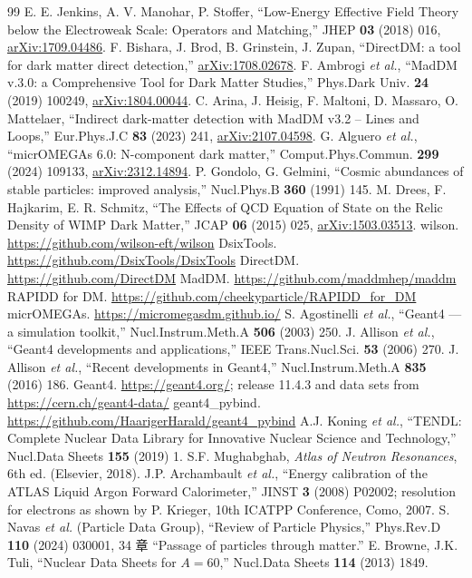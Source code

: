 \documentclass[a4paper,10pt]{ltjsarticle}
\begin{document}
\begin{thebibliography}{99}
 E. E. Jenkins, A. V. Manohar, P. Stoffer, ``Low-Energy Effective Field Theory below the Electroweak Scale: Operators and Matching,'' JHEP \textbf{03} (2018) 016, \href{https://arxiv.org/abs/1709.04486}{arXiv:1709.04486}.
 F. Bishara, J. Brod, B. Grinstein, J. Zupan, ``DirectDM: a tool for dark matter direct detection,'' \href{https://arxiv.org/abs/1708.02678}{arXiv:1708.02678}.
 F. Ambrogi \textit{et al.}, ``MadDM v.3.0: a Comprehensive Tool for Dark Matter Studies,'' Phys.Dark Univ. \textbf{24} (2019) 100249, \href{https://arxiv.org/abs/1804.00044}{arXiv:1804.00044}.
 C. Arina, J. Heisig, F. Maltoni, D. Massaro, O. Mattelaer, ``Indirect dark-matter detection with MadDM v3.2 -- Lines and Loops,'' Eur.Phys.J.C \textbf{83} (2023) 241, \href{https://arxiv.org/abs/2107.04598}{arXiv:2107.04598}.
 G. Alguero \textit{et al.}, ``micrOMEGAs 6.0: N-component dark matter,'' Comput.Phys.Commun. \textbf{299} (2024) 109133, \href{https://arxiv.org/abs/2312.14894}{arXiv:2312.14894}.
 P. Gondolo, G. Gelmini, ``Cosmic abundances of stable particles: improved analysis,'' Nucl.Phys.B \textbf{360} (1991) 145.
 M. Drees, F. Hajkarim, E. R. Schmitz, ``The Effects of QCD Equation of State on the Relic Density of WIMP Dark Matter,'' JCAP \textbf{06} (2015) 025, \href{https://arxiv.org/abs/1503.03513}{arXiv:1503.03513}.
 wilson. \url{https://github.com/wilson-eft/wilson}
 DsixTools. \url{https://github.com/DsixTools/DsixTools}
 DirectDM. \url{https://github.com/DirectDM}
 MadDM. \url{https://github.com/maddmhep/maddm}
 RAPIDD for DM. \url{https://github.com/cheekyparticle/RAPIDD_for_DM}
 micrOMEGAs. \url{https://micromegasdm.github.io/}
 S. Agostinelli \textit{et al.}, ``Geant4 --- a simulation toolkit,'' Nucl.Instrum.Meth.A \textbf{506} (2003) 250.
 J. Allison \textit{et al.}, ``Geant4 developments and applications,'' IEEE Trans.Nucl.Sci. \textbf{53} (2006) 270.
 J. Allison \textit{et al.}, ``Recent developments in Geant4,'' Nucl.Instrum.Meth.A \textbf{835} (2016) 186.
 Geant4. \url{https://geant4.org/}; release 11.4.3 and data sets from \url{https://cern.ch/geant4-data/}
 geant4\_pybind. \url{https://github.com/HaarigerHarald/geant4_pybind}
 A.J. Koning \textit{et al.}, ``TENDL: Complete Nuclear Data Library for Innovative Nuclear Science and Technology,'' Nucl.Data Sheets \textbf{155} (2019) 1.
 S.F. Mughabghab, \textit{Atlas of Neutron Resonances}, 6th ed. (Elsevier, 2018).
 J.P. Archambault \textit{et al.}, ``Energy calibration of the ATLAS Liquid Argon Forward Calorimeter,'' JINST \textbf{3} (2008) P02002; resolution for electrons as shown by P. Krieger, 10th ICATPP Conference, Como, 2007.
 S. Navas \textit{et al.} (Particle Data Group), ``Review of Particle Physics,'' Phys.Rev.D \textbf{110} (2024) 030001, 34 章 ``Passage of particles through matter.''
 E. Browne, J.K. Tuli, ``Nuclear Data Sheets for $A=60$,'' Nucl.Data Sheets \textbf{114} (2013) 1849.
\end{thebibliography}
\end{document}
